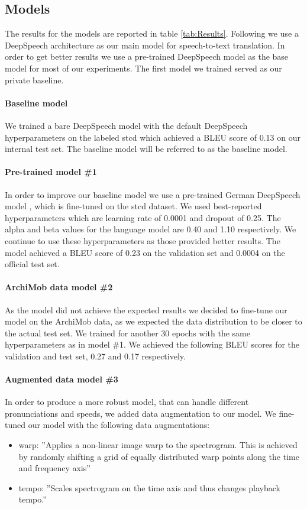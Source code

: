
\subsection{Models}
The results for the models are reported in table \ref{tab:Results}.
Following  we use a DeepSpeech architecture \cite{Hannun2014DeepSS} as our main model for speech-to-text translation. In order to get better results we use a
pre-trained DeepSpeech model \cite{DeepSpeechGerman090} as the base model for most of our experiments. The first model we trained served as our private baseline. \paragraph{Baseline model} We trained a bare DeepSpeech model with the default DeepSpeech hyperparameters on the labeled \gls{stcd} which achieved a BLEU score of 0.13 on our internal test set. The baseline model will be referred to as the baseline model.
\paragraph{Pre-trained model \#1} In order to improve our baseline model we use a pre-trained
German DeepSpeech model \cite{DeepSpeechGerman090}, which is fine-tuned on the \gls{stcd} dataset. We used \citet{Agarwal2020LTLUDEAL} best-reported hyperparameters which are learning rate of 0.0001 and dropout of 0.25. The alpha and beta values for the language model are 0.40 and 1.10 respectively. We continue to use these hyperparameters as those provided better results. The model achieved a BLEU score of
0.23 on the validation set and 0.0004 on the official test set.
\paragraph{ArchiMob data model \#2} As the  model did not achieve the expected results we decided to fine-tune our model on the ArchiMob data, as we expected the data distribution to be closer
to the actual test set. We trained for another 30 epochs with the same hyperparameters as in model \#1. We achieved the following BLEU scores for the validation and test set, 0.27 and 0.17 respectively.
\paragraph{Augmented data model \#3} In order to produce a more robust model, that can handle different pronunciations and speeds, we added data augmentation to our  model. We fine-tuned our
model with the following data augmentations:
\begin{itemize}
    \item warp: ''Applies a non-linear image warp to the spectrogram. This is achieved by randomly shifting a grid of equally distributed warp points along the time and frequency axis''
    \cite{DeepSpeechAugmentation}
    \item tempo: ''Scales spectrogram on the time axis and thus changes playback tempo.'' \cite{DeepSpeechAugmentation}
\end{itemize}

